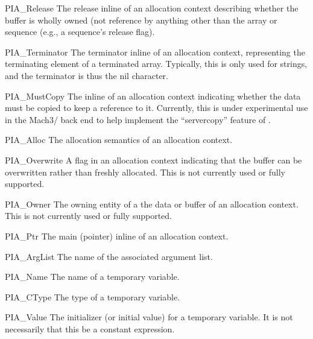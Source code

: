 \begin{cprototypelist}
\begin{cidentifierlist}
    \item[PIA_Release]  The release inline
    of an allocation context describing whether the buffer is wholly owned (not
    reference by anything other than the array or sequence (e.g., a \CORBA{}
    sequence's release flag).

    \item[PIA_Terminator]  The terminator
    inline of an allocation context, representing the terminating element of a
    terminated array.  Typically, this is only used for strings, and the
    terminator is thus the nil character.

    \item[PIA_MustCopy]  The inline of an
    allocation context indicating whether the data must be copied to keep a
    reference to it.  Currently, this is under experimental use in the
    Mach3/\MIG{} back end to help implement the ``servercopy'' feature of
    \MIG{}\@.

    \item[PIA_Alloc]  The allocation
    semantics of an allocation context.

    \item[PIA_Overwrite]  A flag in an allocation
    context indicating that the buffer can be overwritten rather than freshly
    allocated.  This is not currently used or fully supported.

    \item[PIA_Owner]  The owning entity
    of a the data or buffer of an allocation context.  This is not currently
    used or fully supported.

    \item[PIA_Ptr]  The main
    (pointer) inline of an allocation context.

    \item[PIA_ArgList]  The name of the
    associated argument list.

    \item[PIA_Name]  The name of a temporary
    variable.

    \item[PIA_CType]  The \CAST{} type of a
    temporary variable.

    \item[PIA_Value]  The initializer (or
    initial value) for a temporary variable.  It is not necessarily that this
    be a constant expression.


\end{cidentifierlist}
\end{cprototypelist}
